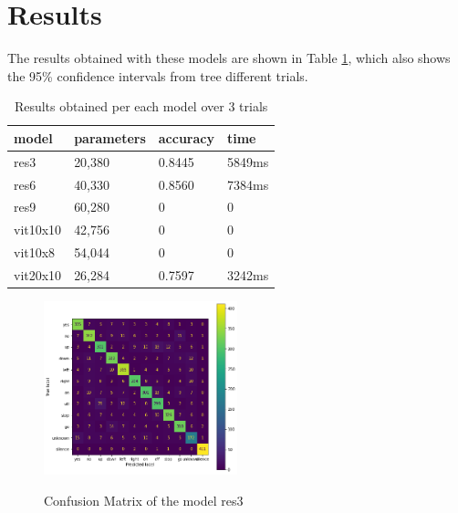 
\section{Results}
\label{sec:results}



The results obtained with these models are shown in Table \ref{table:results}, which also shows the 95\% confidence intervals from tree  different trials.

\begin{table}
	\centering
	\begin{tabular}{|l|l|l|l|}
    \hline
    model  & parameters & accuracy  & time \\
    \hline
    res3 & 20,380 & 0.8445 & 5849ms \\
    \hline
    res6 & 40,330 & 0.8560 & 7384ms\\
    \hline
    res9 & 60,280 & 0 & 0 \\
    \hline
    vit10x10 & 42,756 & 0 & 0  \\
    \hline
    vit10x8  & 54,044 & 0 & 0  \\
    \hline
    vit20x10  & 26,284 & 0.7597 & 3242ms \\
    \hline
    \end{tabular} 
\label{table:results}
\caption{Results obtained per each model over 3 trials}
\end{table}

\begin{figure}[h]
    \centering
    \includegraphics[width=0.5\textwidth]{confusion_matrix_res3_keyword.png}
    \label{fig:confusionmatrix}
    \caption{Confusion Matrix of the model res3}
\end{figure}



